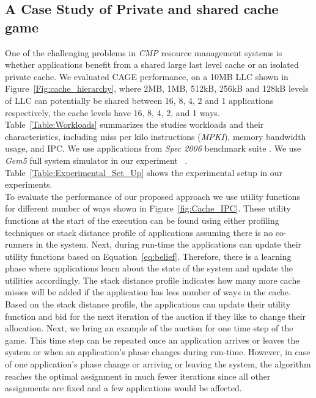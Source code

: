 \subsection{A Case Study of Private and shared cache game}
One of the challenging problems in \textit{CMP} resource management systems is whether applications benefit from a shared large last level cache or an isolated private cache. We evaluated CAGE performance, on a 10MB LLC shown in Figure~\ref{Fig:cache_hierarchy}, where 2MB, 1MB, 512kB, 256kB and 128kB levels of LLC can potentially be shared between 16, 8, 4, 2 and 1 applications respectively, the cache levels have 16, 8, 4, 2, and 1 ways. Table~\ref{Table:Workloads} summarizes the studies workloads and their characteristics, including miss per kilo instructions (\textit{MPKI}), memory bandwidth usage, and IPC. We use applications from \textit{Spec 2006} benchmark suite \cite{Spec:website}. We use \textit{Gem5} full system simulator in our experiment ~\cite{binkert2011gem5, Gem5:website}. Table~\ref{Table:Experimental_Set_Up} shows the experimental setup in our experiments.\\
\indent To evaluate the performance of our proposed approach we use utility functions for different number of ways shown in Figure~\ref{fig:Cache_IPC}. These utility functions at the start of the execution can be found using either profiling techniques or stack distance profile \cite{kim2004fair, suh2002new, suh2004dynamic} of applications assuming there is no co-runners in the system. Next, during run-time the applications can update their utility functions based on Equation~\ref{eq:belief}. Therefore, there is a learning phase where applications learn about the state of the system and update the utilities accordingly. The stack distance profile indicates how many more cache misses will be added if the application has less number of ways in the cache. Based on the stack distance profile, the applications can update their utility function and bid for the next iteration of the auction if they like to change their allocation. Next, we bring an example of the auction for one time step of the game. This time step can be repeated once an application arrives or leaves the system or when an application's phase changes during run-time. However, in case of one application's phase change or arriving or leaving the system, the algorithm reaches the optimal assignment in much fewer iterations since all other assignments are fixed and a few applications would be affected.\\
